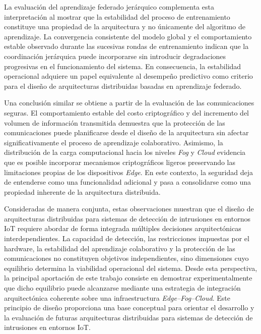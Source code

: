\documentclass[journal,article,submit,moreauthors]{Definitions/mdpi}
\begin{document}
La evaluación del aprendizaje federado jerárquico complementa esta interpretación al mostrar que la estabilidad del proceso de entrenamiento constituye una propiedad de la arquitectura y no únicamente del algoritmo de aprendizaje. La convergencia consistente del modelo global y el comportamiento estable observado durante las sucesivas rondas de entrenamiento indican que la coordinación jerárquica puede incorporarse sin introducir degradaciones progresivas en el funcionamiento del sistema. En consecuencia, la estabilidad operacional adquiere un papel equivalente al desempeño predictivo como criterio para el diseño de arquitecturas distribuidas basadas en aprendizaje federado.

Una conclusión similar se obtiene a partir de la evaluación de las comunicaciones seguras. El comportamiento estable del costo criptográfico y del incremento del volumen de información transmitida demuestra que la protección de las comunicaciones puede planificarse desde el diseño de la arquitectura sin afectar significativamente el proceso de aprendizaje colaborativo. Asimismo, la distribución de la carga computacional hacia los niveles \textit{Fog} y \textit{Cloud} evidencia que es posible incorporar mecanismos criptográficos ligeros preservando las limitaciones propias de los dispositivos \textit{Edge}. En este contexto, la seguridad deja de entenderse como una funcionalidad adicional y pasa a consolidarse como una propiedad inherente de la arquitectura distribuida.

Consideradas de manera conjunta, estas observaciones muestran que el diseño de arquitecturas distribuidas para sistemas de detección de intrusiones en entornos IoT requiere abordar de forma integrada múltiples decisiones arquitectónicas interdependientes. La capacidad de detección, las restricciones impuestas por el hardware, la estabilidad del aprendizaje colaborativo y la protección de las comunicaciones no constituyen objetivos independientes, sino dimensiones cuyo equilibrio determina la viabilidad operacional del sistema. Desde esta perspectiva, la principal aportación de este trabajo consiste en demostrar experimentalmente que dicho equilibrio puede alcanzarse mediante una estrategia de integración arquitectónica coherente sobre una infraestructura \textit{Edge--Fog--Cloud}. Este principio de diseño proporciona una base conceptual para orientar el desarrollo y la evaluación de futuras arquitecturas distribuidas para sistemas de detección de intrusiones en entornos IoT.
\end{document}
